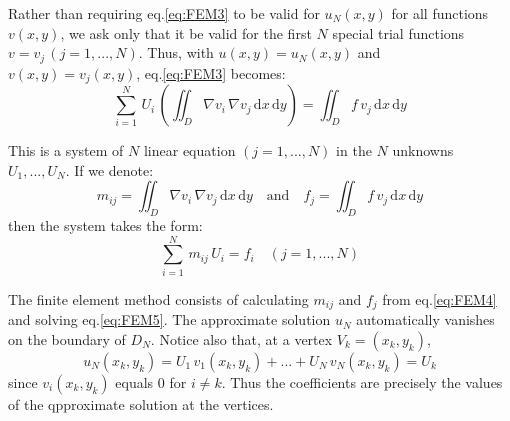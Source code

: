 \documentclass[../main.tex]{subfiles}
\begin{document}
Rather than requiring eq.\ref{eq:FEM3} to be valid for $u_N(x,y)$ for all functions $v(x,y)$, we ask only that it be valid for the first $N$ special trial functions $v = v_j \, (j = 1,...,N)$. Thus, with $u(x,y) = u_N(x,y)$ and $v(x,y) = v_j(x,y)$, eq.\ref{eq:FEM3} becomes:
\begin{equation}
    \sum_{i=1}^N \, U_i \, \left( \iint_D \nabla v_i \, \nabla v_j \, \mathrm{d}x \, \mathrm{d}y \right) = \iint_D f \, v_j \, \mathrm{d}x \, \mathrm{d}y \label{eq:FEM4}
\end{equation}

This is a system of $N$ linear equation $(j = 1,...,N)$ in the $N$ unknowns $U_1,...,U_N$. If we denote:
\begin{equation}
    m_{ij} = \iint_D \nabla v_i \, \nabla v_j \, \mathrm{d}x \, \mathrm{d}y \quad \text{and} \quad f_j = \iint_D f \, v_j \, \mathrm{d}x \, \mathrm{d}y \label{eq:FEM4}
\end{equation}
then the system takes the form:
\begin{equation}
    \sum_{i=1}^N \, m_{ij} \, U_i = f_i \quad (j = 1,...,N) \label{eq:FEM5}
\end{equation}

The finite element method consists of calculating $m_{ij}$ and $f_j$ from eq.\ref{eq:FEM4} and solving eq.\ref{eq:FEM5}. The approximate solution $u_N$ automatically vanishes on the boundary of $D_N$. Notice also that, at a vertex $V_k = (x_k,y_k)$,
\begin{equation}
    u_N(x_k,y_k) = U_1 \, v_1(x_k,y_k) + ... + U_N \, v_N(x_k,y_k) = U_k
\end{equation}
since $v_i(x_k,y_k)$ equals 0 for $i \neq k$. Thus the coefficients are precisely the values of the qpproximate solution at the vertices.
\end{document}
